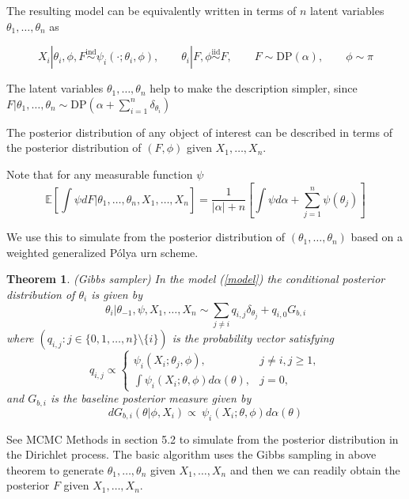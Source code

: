 \documentclass[a4paper,11pt]{article}
\theoremstyle{theorem}
\newtheorem{thm}{Theorem}
\theoremstyle{definition}
\providecommand{\E}{\mathbb{E}}
\begin{document}
The resulting model can be equivalently written in terms of $n$ latent variables $\theta_1, \dotsc, \theta_n$ as

\begin{equation} \label{model}
X_i | \theta_i, \phi, F \overset{\text{ind}}{\sim} \psi_i(\cdot; \theta_i, \phi), \qquad \theta_i | F, \phi \overset{\text{iid}}{\sim} F, \qquad F \sim \text{DP}(\alpha), \qquad \phi \sim \pi
\end{equation}

The latent variables $\theta_1, \dotsc, \theta_n$ help to make the description simpler, since $F | \theta_1, \dotsc, \theta_n \sim \text{DP}(\alpha + \sum_{i=1}^{n}{\delta_{\theta_i}})$

The posterior distribution of any object of interest can be described in terms of the posterior distribution of $(F, \phi)$ given $X_1, \dotsc, X_n$.

Note that for any measurable function $\psi$
\begin{equation} \label{condExp}
\E \left[ \int{\psi dF | \theta_1, \dotsc, \theta_n, X_1, \dotsc, X_n} \right] = \frac{1}{|\alpha| + n}\left[\int{\psi d\alpha} + \sum_{j=1}^{n}{\psi(\theta_j)}\right]
\end{equation}

We use this to simulate from the posterior distribution of $(\theta_1, \dotsc, \theta_n)$ based on a weighted generalized P\'{o}lya urn scheme.

\begin{thm}
(Gibbs sampler) In the model (\ref{model}) the conditional posterior distribution of $\theta_i$ is given by
\begin{equation}
\theta_i | \theta_{-1}, \psi, X_1, \dotsc, X_n \sim \sum_{j \neq i}{q_{i,j} \delta_{\theta_j} + q_{i,0}G_{b,i}} 
\end{equation}
where $(q_{i,j}:j \in \{0,1, \dotsc, n\} \setminus \{i\})$ is the probability vector satisfying
\[
q_{i,j} \propto 
\begin{cases}
\psi_{i}(X_i;\theta_j, \phi), & j \neq i, j \geq 1, \\
\int{\psi_{i}(X_i; \theta, \phi)d\alpha(\theta)}, & j = 0,
\end{cases}
\]
and $G_{b,i}$ is the baseline posterior measure given by
\[
dG_{b,i}(\theta | \phi, X_i) \propto \ \psi_{i}(X_i; \theta, \phi)d\alpha(\theta)
\]
\end{thm}

See MCMC Methods in section 5.2 to simulate from the posterior distribution in the Dirichlet process. The basic algorithm uses the Gibbs sampling in above theorem to generate $\theta_1, \dotsc, \theta_n$ given $X_1, \dotsc, X_n$ and then we can readily obtain the posterior $F$ given $X_1, \dotsc, X_n$.
\end{document}
